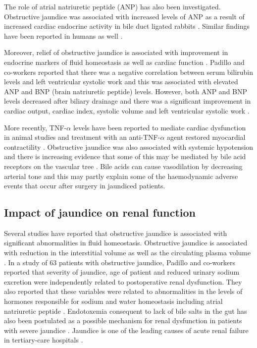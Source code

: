 The role of atrial natriuretic peptide (ANP) has also been investigated. 
Obstructive jaundice was associated with increased levels of ANP as a result of increased cardiac endocrine activity in bile duct ligated rabbits \parencite{pereira_increased_1994}. 
Similar findings have been reported in humans as well \parencite{gallardo_increased_1998, martinez-rodenas_circulating_1998}. 

Moreover, relief of obstructive jaundice is associated with improvement in endocrine markers of fluid homeostasis as well as cardiac function \parencite{padillo_improved_2001, gallardo_increased_1998}. 
Padillo and co-workers reported that there was a negative correlation between serum bilirubin levels and left ventricular systolic work and this was associated with elevated ANP and BNP (brain natriuretic peptide) levels. 
However, both ANP and BNP levels decreased after biliary drainage and there was a significant improvement in cardiac output, cardiac index, systolic volume and left ventricular systolic work \parencite{padillo_improved_2001}. 
	
More recently, TNF-$\alpha$ levels have been reported to mediate cardiac dysfunction in animal studies and treatment with an anti-TNF-$\alpha$ agent restored myocardial contractility \parencite{yang_mechanisms_2010}. 
Obstructive jaundice was also associated with systemic hypotension and there is increasing evidence that some of this may be mediated by bile acid receptors on the vascular tree \parencite{green_systemic_1995, lefebvre_role_2009}. 
Bile acids can cause vasodilation by decreasing arterial tone and this may partly explain some of the haemodynamic adverse events that occur after surgery in jaundiced patients.

\subsection{Impact of jaundice on renal function}

Several studies have reported that obstructive jaundice is associated with significant abnormalities in fluid homeostasis. 
Obstructive jaundice is associated with reduction in the interstitial volume as well as the circulating plasma volume \parencite{sitges-serra_body_1992, padillo_preoperative_1999}. 
In a study of 63 patients with obstructive jaundice, Padillo and co-workers reported that severity of jaundice, age of patient and reduced urinary sodium excretion were independently related to postoperative renal dysfunction. 
They also reported that these variables were related to abnormalities in the levels of hormones responsible for sodium and water homeostasis including atrial natriuretic peptide \parencite{padillo_multivariate_2005}. 
Endotoxemia consequent to lack of bile salts in the gut has also been postulated as a possible mechanism for renal dysfunction in patients with severe jaundice \parencite{bailey_endotoxin_1976}. 
Jaundice is one of the leading causes of acute renal failure in tertiary-care hospitals \parencite{liano_epidemiology_1996}. 

